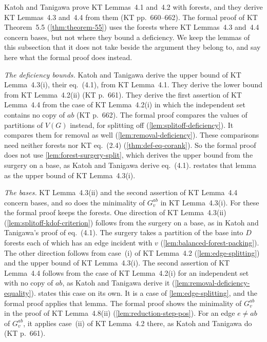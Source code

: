 \begin{remark}
  \label{rem:forest-surgery-kt-steps}
  Katoh and Tanigawa prove KT Lemmas~4.1 and~4.2 with forests, and they
  derive KT Lemmas~4.3 and~4.4 from them (KT pp.~660--662). The formal
  proof of KT Theorem~5.5 (\cref{thm:theorem-55}) uses the forests where
  KT Lemmas~4.3 and~4.4 concern bases, but not where they bound a
  deficiency. We keep the lemmas of this subsection that it does not
  take beside the argument they belong to, and say here what the formal
  proof does instead.

  \emph{The deficiency bounds.} Katoh and Tanigawa derive the upper bound
  of KT Lemma~4.3(i), their eq.~(4.1), from KT Lemma~4.1. They derive the
  lower bound from KT Lemma~4.2(ii) (KT p.~661). They derive the first
  assertion of KT Lemma~4.4 from the case of KT Lemma~4.2(i) in which the
  independent set contains no copy of $ab$ (KT p.~662). The formal proof
  compares the values of partitions of $V(G)$ instead, for splitting off
  (\cref{lem:splitoff-deficiency}). It compares them for removal as well
  (\cref{lem:removal-deficiency}). These comparisons need neither forests
  nor KT eq.~(2.4) (\cref{thm:def-eq-corank}). So the formal proof does
  not use \cref{lem:forest-surgery-split}, which derives the upper bound
  from the surgery on a base, as Katoh and Tanigawa derive eq.~(4.1).
   restates that lemma as the upper
  bound of KT Lemma~4.3(i).

  \emph{The bases.} KT Lemma~4.3(ii) and the second assertion of KT
  Lemma~4.4 concern bases, and so does the minimality of $G_v^{ab}$ in
  KT Lemma~4.3(i). For these the formal proof keeps the forests. One
  direction of KT Lemma~4.3(ii) (\cref{lem:splitoff-kdof-criterion})
  follows from the surgery on a base, as in Katoh and Tanigawa's proof
  of eq.~(4.1). The surgery takes a partition of the base into $D$
  forests each of which has an edge incident with $v$
  (\cref{lem:balanced-forest-packing}). The other direction follows from
  case~(i) of KT Lemma~4.2 (\cref{lem:edge-splitting}) and the upper
  bound of KT Lemma~4.3(i). The second
  assertion of KT Lemma~4.4 follows from the case of KT Lemma~4.2(i) for
  an independent set with no copy of $ab$, as Katoh and Tanigawa derive
  it (\cref{lem:removal-deficiency-equality}).
   states this case on its own. It is a
  case of \cref{lem:edge-splitting}, and the formal proof applies that
  lemma. The formal proof shows the minimality of $G_v^{ab}$ in the
  proof of KT Lemma~4.8(ii) (\cref{lem:reduction-step-pos}). For an edge
  $e \neq ab$ of $G_v^{ab}$, it applies case~(ii) of KT Lemma~4.2 there,
  as Katoh and Tanigawa do (KT p.~661).
\end{remark}

